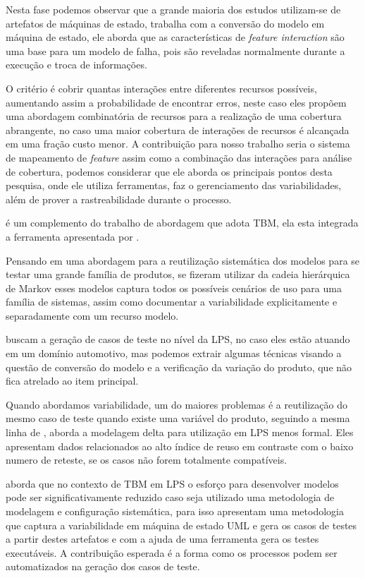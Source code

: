 Nesta fase podemos observar que a grande maioria dos estudos utilizam-se de artefatos de máquinas de estado, \cite{oster2011pairwise} trabalha com a conversão do modelo em máquina de estado, ele aborda que as características de \textit{feature interaction} são uma base para um modelo de falha, pois são reveladas normalmente durante a execução e troca de informações. 

O critério é cobrir quantas interações entre diferentes recursos possíveis, aumentando assim a probabilidade de encontrar erros, neste caso eles propõem uma abordagem combinatória de recursos para a realização de uma cobertura abrangente, no caso uma maior cobertura de interações de recursos é alcançada em uma fração custo menor. A contribuição para nosso trabalho seria o sistema de mapeamento de \textit{feature} assim como a combinação das interações para análise de cobertura, podemos considerar que ele aborda os principais pontos desta pesquisa, onde ele utiliza ferramentas, faz o gerenciamento das variabilidades, além de prover a rastreabilidade durante o processo.

\cite{samih2014deriving} é um complemento do trabalho de \cite{samih2014mplm} abordagem que adota TBM, ela esta integrada a ferramenta apresentada por \cite{samih2014mplm}.

Pensando em uma abordagem para a reutilização sistemática dos modelos para se testar uma grande família de produtos, \cite{gebizli2016model} se fizeram utilizar da cadeia hierárquica de Markov esses modelos captura todos os possíveis cenários de uso para uma família de sistemas, assim como documentar a variabilidade explicitamente e separadamente com um recurso modelo.

\cite{lackner2014model} buscam a geração de casos de teste no nível da LPS, no caso eles estão atuando em um domínio automotivo, mas podemos extrair algumas técnicas visando a questão de conversão do modelo e a verificação da variação do produto, que não fica atrelado ao item principal.

Quando abordamos variabilidade, um do maiores problemas é a reutilização do mesmo caso de teste quando existe uma variável do produto, seguindo a mesma linha de \cite{lity2012delta}, \cite{dukaczewski2013requirements} aborda a modelagem delta para utilização em LPS menos formal. Eles apresentam dados relacionados ao alto índice de reuso em contraste com o baixo numero de reteste, se os casos não forem totalmente compatíveis.

\cite{wang2013using} aborda que no contexto de TBM em LPS o esforço para desenvolver modelos pode ser significativamente reduzido caso seja utilizado uma metodologia de modelagem e configuração sistemática, para isso apresentam uma metodologia que captura a variabilidade em máquina de estado UML e gera os casos de testes a partir destes artefatos e com a ajuda de uma ferramenta gera os testes executáveis. A contribuição esperada é a forma como os processos podem ser automatizados na geração dos casos de teste.

